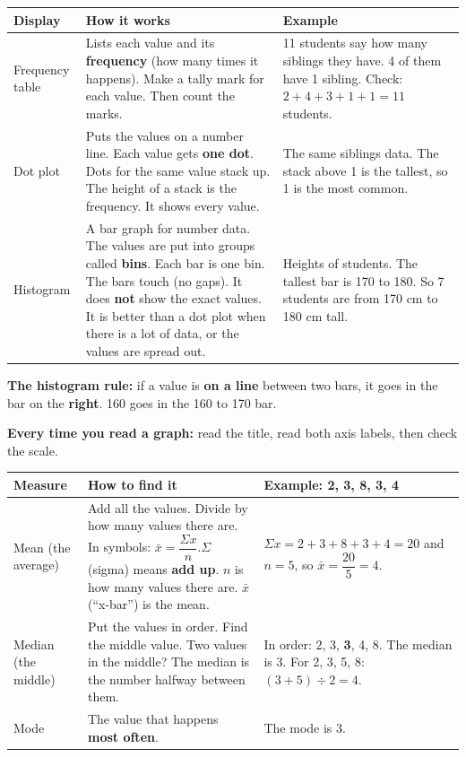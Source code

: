 \documentclass[11pt]{article}
\newcommand{\sumhead}[1]{\par\vspace{0.7em}{\large\bfseries #1}\par\vspace{0.3em}}
\newlength{\sumtw}
\newcommand{\sumtitle}[1]{\settowidth{\sumtw}{\Large\bfseries #1}%
  \ifdim\sumtw>4.3in \hfill Name \underline{\hspace{2in}}\par\vspace{0.5em}{\Large\bfseries #1}\par\vspace{0.6em}%
  \else {\Large\bfseries #1}\hfill Name \underline{\hspace{2in}}\par\vspace{0.6em}\fi}
\begin{document}
\sumtitle{Unit 1 Summary: Displaying One Variable}

\sumhead{Showing the Data}
\begin{tabular}{|L{1.2in}|L{2.95in}|L{2.3in}|}\hline
\textbf{Display} & \textbf{How it works} & \textbf{Example}\\ \hline
Frequency table & Lists each value and its \textbf{frequency} (how many times it happens). Make a tally mark for each value. Then count the marks. & 11 students say how many siblings they have. 4 of them have 1 sibling. Check: $2 + 4 + 3 + 1 + 1 = 11$ students.\\ \hline
Dot plot & Puts the values on a number line. Each value gets \textbf{one dot}. Dots for the same value stack up. The height of a stack is the frequency. It shows every value. & The same siblings data. The stack above 1 is the tallest, so 1 is the most common.\\ \hline
Histogram & A bar graph for number data. The values are put into groups called \textbf{bins}. Each bar is one bin. The bars touch (no gaps). It does \textbf{not} show the exact values. It is better than a dot plot when there is a lot of data, or the values are spread out. & Heights of students. The tallest bar is 170 to 180. So 7 students are from 170 cm to 180 cm tall.\\ \hline
\end{tabular}

\vspace{0.3em}
\textbf{The histogram rule:} if a value is \textbf{on a line} between two bars, it goes in the bar on the \textbf{right}. 160 goes in the 160 to 170 bar.

\vspace{0.3em}
\textbf{Every time you read a graph:} read the title, read both axis labels, then check the scale.

\sumhead{Center}
\begin{tabular}{|L{1.2in}|L{2.95in}|L{2.3in}|}\hline
\textbf{Measure} & \textbf{How to find it} & \textbf{Example: 2, 3, 8, 3, 4}\\ \hline
Mean (the average) & Add all the values. Divide by how many values there are. In symbols: $\bar{x} = \dfrac{\Sigma x}{n}$.\newline $\Sigma$ (sigma) means \textbf{add up}. $n$ is how many values there are. $\bar{x}$ (``x-bar'') is the mean. & $\Sigma x = 2 + 3 + 8 + 3 + 4 = 20$ and $n = 5$, so $\bar{x} = \dfrac{20}{5} = 4$.\\ \hline
Median (the middle) & Put the values in order. Find the middle value. Two values in the middle? The median is the number halfway between them. & In order: 2, 3, \textbf{3}, 4, 8. The median is 3. For 2, 3, 5, 8: $(3 + 5) \div 2 = 4$.\\ \hline
Mode & The value that happens \textbf{most often}. & The mode is 3.\\ \hline
\end{tabular}
\end{document}
